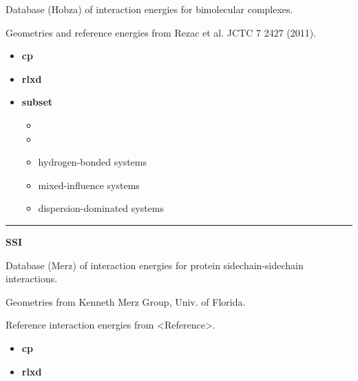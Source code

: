 \documentclass[letterpaper,10pt,english]{sphinxmanual}
\begin{document}
\begin{DUlineblock}{0em}
\item[] Database (Hobza) of interaction energies for bimolecular complexes.
\item[] Geometries and reference energies from Rezac et al. JCTC 7 2427 (2011).
\end{DUlineblock}
\begin{itemize}
\item {} 
\textbf{cp}   \textbar{}\textbar{} 

\item {} 
\textbf{rlxd} 

\item {} 
\textbf{subset}
\begin{itemize}
\item {} 

\item {} 

\item {} 
 hydrogen-bonded systems

\item {} 
 mixed-influence systems

\item {} 
 dispersion-dominated systems

\end{itemize}

\end{itemize}


\bigskip\hrule{}\bigskip

\label{db:module-SSI}
\textbf{SSI}

\begin{DUlineblock}{0em}
\item[] Database (Merz) of interaction energies for protein sidechain-sidechain interactions.
\item[] Geometries from Kenneth Merz Group, Univ. of Florida.
\item[] Reference interaction energies from \textless{}Reference\textgreater{}.
\end{DUlineblock}
\begin{itemize}
\item {} 
\textbf{cp}   \textbar{}\textbar{} 

\item {} 
\textbf{rlxd} 

\end{itemize}
\end{document}
